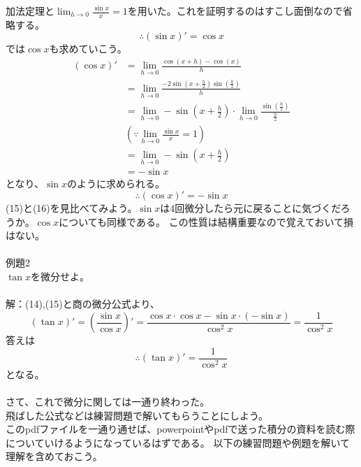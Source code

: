 \documentclass[a4j,dvipdfmx]{jsarticle}
\begin{document}
    加法定理と$\lim_{h\rightarrow0}\frac{\sin x}{x}=1$を用いた。これを証明するのはすこし面倒なので省略する。\\
    \begin{equation}
        \therefore(\sin x)'=\cos x
    \end{equation}
    では$\cos x$も求めていこう。
    \begin{align*}
        (\cos x)'&=\lim_{h\rightarrow0}\frac{\cos(x+h)-\cos(x)}{h}\\
        &=\lim_{h\rightarrow0}\frac{-2\sin(x+\frac{h}{2})\sin(\frac{h}{2})}{h}\\
        &=\lim_{h\rightarrow0}-\sin(x+\frac{h}{2})\cdot\lim_{h\rightarrow0}\frac{\sin(\frac{h}{2})}{\frac{h}{2}}\\
        &(\because \lim_{h\rightarrow0}\frac{\sin x}{x}=1)\\
        &=\lim_{h\rightarrow0}-\sin(x+\frac{h}{2})\\
        &=-\sin x
    \end{align*}
    となり、$\sin x$のように求められる。\\
    \begin{equation}
        \therefore(\cos x)'=-\sin x
    \end{equation}
    (15)と(16)を見比べてみよう。$\sin x$は4回微分したら元に戻ることに気づくだろうか。$\cos x$についても同様である。
    この性質は結構重要なので覚えておいて損はない。\\\\
    例題2\\
    $\tan x$を微分せよ。\\\\
    解：(14),(15)と商の微分公式より、
    \begin{equation*}
        (\tan x)'=(\frac{\sin x}{\cos x})'=\frac{\cos x\cdot\cos x - \sin x\cdot(-\sin x)}{\cos^2x}=\frac{1}{\cos^2 x}
    \end{equation*}
    答えは
    \begin{equation}
        \therefore(\tan x)'=\frac{1}{\cos^2x}
    \end{equation}
    となる。\\\\
    さて、これで微分に関しては一通り終わった。\\
    飛ばした公式などは練習問題で解いてもらうことにしよう。\\
    このpdfファイルを一通り通せば、powerpointやpdfで送った積分の資料を読む際についていけるようになっているはずである。
    以下の練習問題や例題を解いて理解を含めておこう。\\\\
\end{document}
